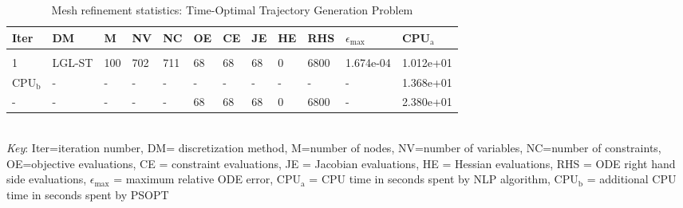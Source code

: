 
\begin{table}
\caption{Mesh refinement statistics: Time-Optimal Trajectory Generation Problem}
\label{mesh_stats_traj}
\renewcommand{\tabcolsep}{0.15cm}
\tiny
\begin{tabular}{llllllllllll}
Iter&DM&M&NV&NC&OE&CE&JE&HE&RHS&$\epsilon_{\max}$&CPU$_\mathrm{a}$ \\ \hline \\
1&LGL-ST&100&702&711&68&68&68&0&6800&1.674e-04&1.012e+01\\
\hline
CPU$_\mathrm{b}$ &-&-&-&-&-&-&-&-&-&-&1.368e+01\\
-&-&-&-&-&68&68&68&0&6800&-&2.380e+01\\
\end{tabular}
\newline \\ \emph{Key}: Iter=iteration number, DM= discretization method, M=number of nodes, NV=number of variables, NC=number of constraints, OE=objective evaluations,  	              CE = constraint evaluations, JE = Jacobian evaluations, HE = Hessian evaluations, RHS = ODE right hand side 		      evaluations, $\epsilon_{\max}$ = maximum relative ODE error, CPU$_\mathrm{a}$ = CPU time in seconds spent by NLP algorithm, 		      CPU$_\mathrm{b}$ = additional CPU time in seconds spent by PSOPT
\normalsize
\end{table}